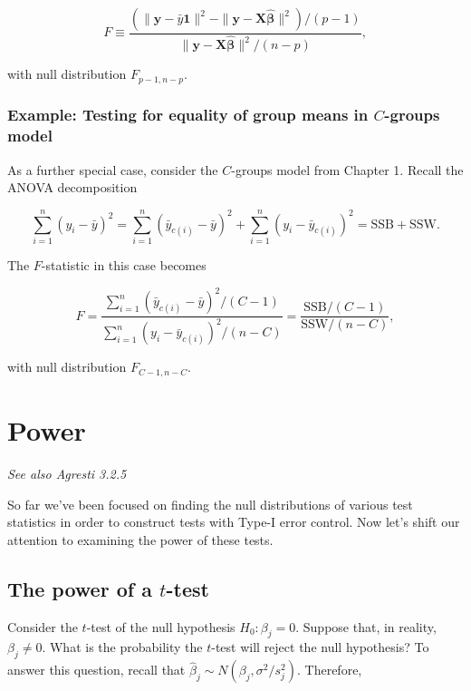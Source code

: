 \documentclass[
  11pt,
  letterpaper,
  oneside]{book}
\theoremstyle{definition}
\theoremstyle{plain}
\theoremstyle{plain}
\theoremstyle{plain}
\theoremstyle{remark}
\begin{document}
\[
F \equiv \frac{(\|\boldsymbol{y} - \bar{y} \boldsymbol{1}\|^2 - \|\boldsymbol{y} - \boldsymbol{X} \boldsymbol{\widehat{\beta}}\|^2)/(p-1)}{\|\boldsymbol{y} - \boldsymbol{X} \boldsymbol{\widehat{\beta}}\|^2/(n-p)},
\]

with null distribution \(F_{p-1, n-p}\).

\hypertarget{example-testing-for-equality-of-group-means-in-c-groups-model}{%
\subsection{\texorpdfstring{Example: Testing for equality of group means
in \(C\)-groups
model}{Example: Testing for equality of group means in C-groups model}}\label{example-testing-for-equality-of-group-means-in-c-groups-model}}

As a further special case, consider the \(C\)-groups model from Chapter
1. Recall the ANOVA decomposition

\[
\sum_{i = 1}^n (y_i - \bar{y})^2 = \sum_{i = 1}^n (\bar{y}_{c(i)} - \bar{y})^2 + \sum_{i = 1}^n (y_i - \bar{y}_{c(i)})^2 = \text{SSB} + \text{SSW}.
\]

The \(F\)-statistic in this case becomes

\[
F = \frac{\sum_{i = 1}^n (\bar{y}_{c(i)} - \bar{y})^2/(C-1)}{\sum_{i = 1}^n (y_i - \bar{y}_{c(i)})^2/(n-C)} = \frac{\text{SSB}/(C-1)}{\text{SSW}/(n-C)},
\]

with null distribution \(F_{C-1, n-C}\).

\hypertarget{sec-power}{%
\chapter{Power}\label{sec-power}}

\emph{See also Agresti 3.2.5}

So far we've been focused on finding the null distributions of various
test statistics in order to construct tests with Type-I error control.
Now let's shift our attention to examining the power of these tests.

\hypertarget{the-power-of-a-t-test}{%
\section{\texorpdfstring{The power of a
\(t\)-test}{The power of a t-test}}\label{the-power-of-a-t-test}}

Consider the \(t\)-test of the null hypothesis \(H_0: \beta_j = 0\).
Suppose that, in reality, \(\beta_j \neq 0\). What is the probability
the \(t\)-test will reject the null hypothesis? To answer this question,
recall that \(\widehat \beta_j \sim N(\beta_j, \sigma^2/s_j^2)\).
Therefore,
\end{document}
